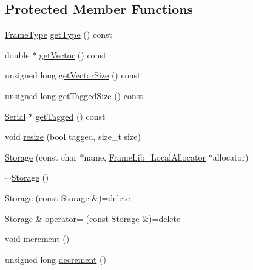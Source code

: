 \subsection*{Protected Member Functions}
\begin{DoxyCompactItemize}
\item 
\hyperlink{_frame_lib___types_8h_ad495a9f61af7fff07d7e97979d1ab854}{Frame\+Type} \hyperlink{class_frame_lib___local_allocator_1_1_storage_ad32b168f553ec8bfebe03a09bd4f5617}{get\+Type} () const
\item 
double $\ast$ \hyperlink{class_frame_lib___local_allocator_1_1_storage_a8f5940887df76dcc85b47368bf181b95}{get\+Vector} () const
\item 
unsigned long \hyperlink{class_frame_lib___local_allocator_1_1_storage_abcff0780f5809e833bb241205f87d356}{get\+Vector\+Size} () const
\item 
unsigned long \hyperlink{class_frame_lib___local_allocator_1_1_storage_a97b908fd494c73e037e9af8730e67ebb}{get\+Tagged\+Size} () const
\item 
\hyperlink{class_frame_lib___parameters_1_1_serial}{Serial} $\ast$ \hyperlink{class_frame_lib___local_allocator_1_1_storage_aaca03c77d94f96049ee65ca1ede99450}{get\+Tagged} () const
\item 
void \hyperlink{class_frame_lib___local_allocator_1_1_storage_a3b432eda27a1cd4ca6fce89015c60c75}{resize} (bool tagged, size\+\_\+t size)
\item 
\hyperlink{class_frame_lib___local_allocator_1_1_storage_a51742c2b24393570cf3478d0ad7530f8}{Storage} (const char $\ast$name, \hyperlink{class_frame_lib___local_allocator}{Frame\+Lib\+\_\+\+Local\+Allocator} $\ast$allocator)
\item 
\hyperlink{class_frame_lib___local_allocator_1_1_storage_a562e98ee56a7fcff07f90621572688b1}{$\sim$\+Storage} ()
\item 
\hyperlink{class_frame_lib___local_allocator_1_1_storage_aa3c128a573d8d69cf8f990361c21ed7f}{Storage} (const \hyperlink{class_frame_lib___local_allocator_1_1_storage}{Storage} \&)=delete
\item 
\hyperlink{class_frame_lib___local_allocator_1_1_storage}{Storage} \& \hyperlink{class_frame_lib___local_allocator_1_1_storage_a93d7ce8d96576ecb14b79f00afcad050}{operator=} (const \hyperlink{class_frame_lib___local_allocator_1_1_storage}{Storage} \&)=delete
\item 
void \hyperlink{class_frame_lib___local_allocator_1_1_storage_a6589845a528ed83f75785003a32aaeb0}{increment} ()
\item 
unsigned long \hyperlink{class_frame_lib___local_allocator_1_1_storage_af9f0b3faffe38cc459d28dfec814d158}{decrement} ()
\end{DoxyCompactItemize}

